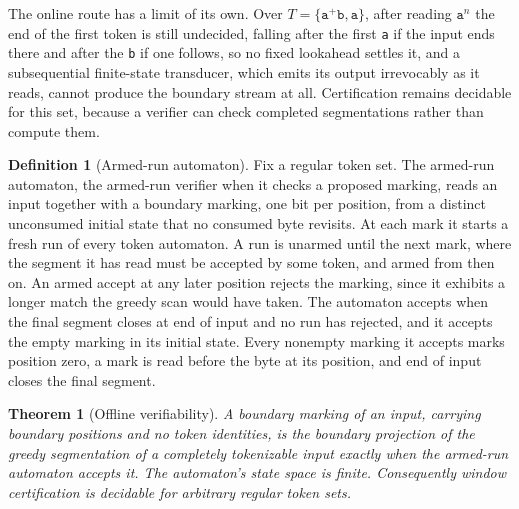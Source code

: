 \documentclass[11pt,a4paper]{article}
\theoremstyle{definition}
\newtheorem{definition}{Definition}
\theoremstyle{plain}
\newtheorem{theorem}{Theorem}
\newcommand{\code}[1]{\texttt{#1}}
\begin{document}
The online route has a limit of its own. Over $T = \{\code{a}^{+}\code{b}, \code{a}\}$, after reading $\code{a}^{n}$ the
end of the first token is still undecided, falling after the first \code{a} if the input ends there and after the
\code{b} if one follows, so no fixed lookahead settles it, and a subsequential finite-state transducer, which emits its
output irrevocably as it reads, cannot produce the boundary stream at all. Certification remains decidable for this set,
because a verifier can check completed segmentations rather than compute them.

\begin{definition}[Armed-run automaton]\label{def:armed}
Fix a regular token set. The armed-run automaton, the armed-run verifier when it checks a proposed marking, reads an
input together with a boundary marking, one bit per position, from a distinct unconsumed initial state that no consumed
byte revisits. At each mark it starts a fresh run of every token automaton. A run is unarmed until the next mark, where
the segment it has read must be accepted by some token, and armed from then on. An armed accept at any later position
rejects the marking, since it exhibits a longer match the greedy scan would have taken. The automaton accepts when the
final segment closes at end of input and no run has rejected, and it accepts the empty marking in its initial state.
Every nonempty marking it accepts marks position zero, a mark is read before the byte at its position, and end of input
closes the final segment.
\end{definition}

\begin{theorem}[Offline verifiability]\label{thm:offline}
A boundary marking of an input, carrying boundary positions and no token identities, is the boundary projection of the
greedy segmentation of a completely tokenizable input exactly when the armed-run automaton accepts it. The automaton's
state space is finite. Consequently window certification is decidable for arbitrary regular token sets.
\end{theorem}
\end{document}
